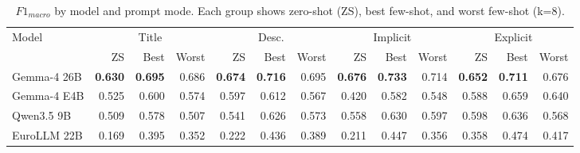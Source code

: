\begin{table}[t]
\centering
\caption{$F1_{macro}$ by model and prompt mode. Each group shows zero-shot (ZS), best few-shot, and worst few-shot (k=8).}
\label{tab:a1-model-prompt}
\small
\setlength{\tabcolsep}{4pt}
\begin{tabular}{lrrrrrrrrrrrr}
\toprule
Model & \multicolumn{3}{c}{Title} & \multicolumn{3}{c}{Desc.} & \multicolumn{3}{c}{Implicit} & \multicolumn{3}{c}{Explicit} \\
\cmidrule(lr){2-4} \cmidrule(lr){5-7} \cmidrule(lr){8-10} \cmidrule(lr){11-13}
 & ZS & Best & Worst & ZS & Best & Worst & ZS & Best & Worst & ZS & Best & Worst \\
\midrule
Gemma-4 26B & \textbf{0.630} & \textbf{0.695} & 0.686 & \textbf{0.674} & \textbf{0.716} & 0.695 & \textbf{0.676} & \textbf{0.733} & 0.714 & \textbf{0.652} & \textbf{0.711} & 0.676 \\
Gemma-4 E4B & 0.525 & 0.600 & 0.574 & 0.597 & 0.612 & 0.567 & 0.420 & 0.582 & 0.548 & 0.588 & 0.659 & 0.640 \\
Qwen3.5 9B & 0.509 & 0.578 & 0.507 & 0.541 & 0.626 & 0.573 & 0.558 & 0.630 & 0.597 & 0.598 & 0.636 & 0.568 \\
EuroLLM 22B & 0.169 & 0.395 & 0.352 & 0.222 & 0.436 & 0.389 & 0.211 & 0.447 & 0.356 & 0.358 & 0.474 & 0.417 \\
\bottomrule
\end{tabular}
\end{table}